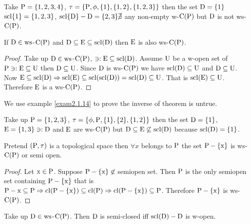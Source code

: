 \begin{exm}\label{exam2.1.13}
Take $\mathrm{P}=\{1,2,3,4\}$, $\tau=\{\mathrm{P},\phi,\{1\},\{1, 2\},\{1,2,3\}\}$ then the set $\mathrm{D}=\{1\}$ $\mathrm{scl}\{1\}=\{1,2,3\}$, $\mathrm{scl}\{\mathrm{D}\}-\mathrm{D}=\{2,3\}\cancel{\exists}$ any non-empty w-$\mathrm{C}(\mathrm{P})$ but $\mathrm{D}$ is not ws-$\mathrm{C}(\mathrm{P})$.
\end{exm}

\begin{thm}\label{thm2.1.8}
If $\mathrm{D}\in\mathrm{ws}$-$\mathrm{C}(\mathrm{P})$ and $\mathrm{D}\subseteq \mathrm{E}\subseteq \mathrm{scl}(\mathrm{D})$ then $\mathrm{E}$ is also ws-$\mathrm{C}(\mathrm{P})$.
\end{thm}

\begin{proof}
Take up $\mathrm{D}\in \mathrm{ws}$-$\mathrm{C}(\mathrm{P})$, $\ni: \mathrm{E}\subseteq \mathrm{scl}(\mathrm{D})$. Assume $\mathrm{U}$ be a w-open set of $\mathrm{P} \ni: \mathrm{E}\subseteq \mathrm{U}$ then $\mathrm{D}\subseteq \mathrm{U}$. Since $\mathrm{D}$ is ws-$\mathrm{C}(\mathrm{P})$ we have $\mathrm{scl}(\mathrm{D})\subseteq \mathrm{U}$ and $\mathrm{D}\subseteq \mathrm{U}$. Now $\mathrm{E}\subseteq \mathrm{scl}(\mathrm{D})\Rightarrow\mathrm{scl}(\mathrm{E})\subseteq \mathrm{scl}(\mathrm{scl}(\mathrm{D}))=\mathrm{scl}(\mathrm{D})\subseteq \mathrm{U}$. That is $\mathrm{scl}(\mathrm{E})\subseteq \mathrm{U}$. Therefore $\mathrm{E}$ is a ws-$\mathrm{C}(\mathrm{P})$.
\end{proof}

We use example \ref{exam2.1.14} to prove the inverse of theorem is untrue.

\begin{exm}\label{exam2.1.14}
Take up $\mathrm{P} = \{1,2,3 \}$, $\tau = \{\phi, \mathrm{P}, \{1\}, \{2\}, \{1, 2\}\}$ then the set $\mathrm{D}=\{1\}$, $\mathrm{E}=\{1,3\}\ni:\mathrm{D}$ and $\mathrm{E}$ are ws-$\mathrm{C}(\mathrm{P})$ but $\mathrm{D}\subseteq \mathrm{E} \not\subseteq\mathrm{scl}(\mathrm{D})$ because $\mathrm{scl}(\mathrm{D})=\{1\}$.
\end{exm}

\begin{thm}\label{thm2.1.9}
Pretend $(\mathrm{P},\tau)$ is a topological space then $\forall x$ belongs to $\mathrm{P}$ the set $\mathrm{P}-\{\mathrm{x}\}$ is ws-$\mathrm{C}(\mathrm{P})$ or semi open.
\end{thm}

\begin{proof}
Let $\mathrm{x}\in\mathrm{P}$. Suppose $\mathrm{P}-\{\mathrm{x}\}\not\in$ semiopen set. Then $\mathrm{P}$ is the only semiopen set containing $\mathrm{P}-\{\mathrm{x}\}$ that is $\mathrm{P}-{\mathrm{x}} \subseteq \mathrm{P}\Rightarrow \mathrm{cl}(\mathrm{P}-\{\mathrm{x}\}) \subseteq \mathrm{cl}(\mathrm{P})\Rightarrow \mathrm{cl}(\mathrm{P}-\{\mathrm{x}\})\subseteq \mathrm{P}$. Therefore $\mathrm{P}-\{\mathrm{x}\}$ is ws-$\mathrm{C}(\mathrm{P})$.
\end{proof}

\begin{thm}\label{thm2.1.10}
Take up $\mathrm{D}\in \mathrm{ws}$-$\mathrm{C}(\mathrm{P})$. Then $\mathrm{D}$ is semi-closed iff $\mathrm{scl}(\mathrm{D})-\mathrm{D}$ is w-open.
\end{thm}

